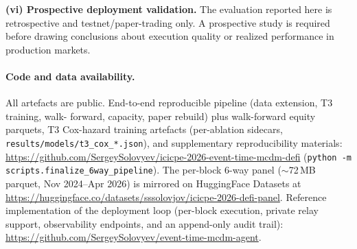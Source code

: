 \textbf{(vi) Prospective deployment validation.}  The evaluation
reported here is retrospective and testnet/paper-trading only.
A prospective study is required before drawing conclusions about
execution quality or realized performance in production markets.


\paragraph{Code and data availability.}  All artefacts are public.
End-to-end reproducible pipeline (data extension, T3 training, walk-
forward, capacity, paper rebuild) plus walk-forward equity parquets,
T3 Cox-hazard training artefacts (per-ablation sidecars,
\texttt{results/models/t3\_cox\_*.json}), and supplementary
reproducibility materials:
\url{https://github.com/SergeySolovyev/icicpe-2026-event-time-mcdm-defi}
(\texttt{python -m scripts.finalize\_6way\_pipeline}). The per-block
6-way panel ($\sim$72\,MB parquet, Nov 2024--Apr 2026) is mirrored
on HuggingFace Datasets at
\url{https://huggingface.co/datasets/sssolovjov/icicpe-2026-defi-panel}.
Reference implementation of the deployment loop (per-block
execution, private relay support, observability endpoints, and an
append-only audit trail):
\url{https://github.com/SergeySolovyev/event-time-mcdm-agent}.
